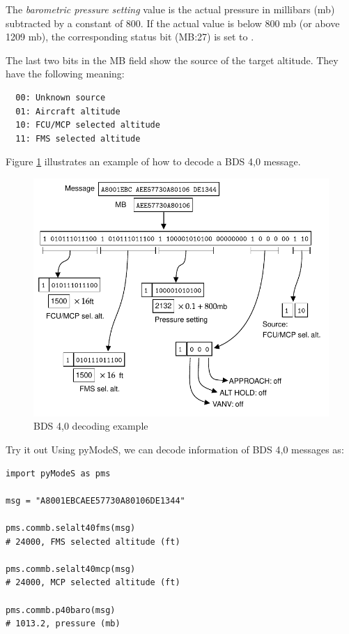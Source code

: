 The \emph{barometric pressure setting} value is the actual pressure in millibars (mb) subtracted by a constant of 800. If the actual value is below 800 mb (or above 1209 mb), the corresponding status bit (MB:27) is set to \0.

The last two bits in the MB field show the source of the target altitude. They have the following meaning:

\begin{verbatim}
  00: Unknown source
  01: Aircraft altitude
  10: FCU/MCP selected altitude
  11: FMS selected altitude
\end{verbatim}


Figure \ref{fig:bds40_example} illustrates an example of how to decode a BDS 4,0 message.

\begin{figure}[ht]
  \centering
  \includegraphics[scale=0.9]{figures/mode_s/bds40_example.pdf}
  \caption{BDS 4,0 decoding example}
  \label{fig:bds40_example}
\end{figure}

\begin{notebox}{Try it out}
Using pyModeS, we can decode information of BDS 4,0 messages as: 

\begin{verbatim}
import pyModeS as pms

msg = "A8001EBCAEE57730A80106DE1344"

pms.commb.selalt40fms(msg)
# 24000, FMS selected altitude (ft)

pms.commb.selalt40mcp(msg)
# 24000, MCP selected altitude (ft)

pms.commb.p40baro(msg)
# 1013.2, pressure (mb)
\end{verbatim}

\end{notebox}


